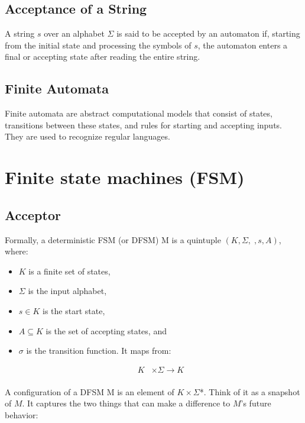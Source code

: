\documentclass[hidelinks,12pt]{article}
\begin{document}
\subsection{Acceptance of a String}
A string $s$ over an alphabet $\Sigma$ is said to be accepted by an automaton
if, starting from the initial state and processing the symbols of $s$, the
automaton enters a final or accepting state after reading the entire string.

\subsection{Finite Automata}
Finite automata are abstract computational models that consist of states,
transitions between these states, and rules for starting and accepting inputs.
They are used to recognize regular languages.


\section{Finite state machines (FSM)}

\subsection{Acceptor}

Formally, a deterministic FSM (or DFSM) M is a quintuple $(K, \Sigma, , s, A)$,
where: 



\begin{itemize} 
    \item $K$ is a finite set of states,
    \item $\Sigma$ is the input alphabet, 
    \item $s \in K$ is the start state, 
    \item $A \subseteq K$ is the set of accepting states, and 
    \item $\sigma$ is the transition function. It maps from:

        \begin{align*} 
            K &\times \Sigma \to K \\ 
        \end{align*}

\end{itemize}

A configuration of a DFSM M is an element of $K \times \Sigma$*. Think of it as a snapshot
of $M$. It captures the two things that can make a difference to $M$’s future
behavior:
\end{document}
